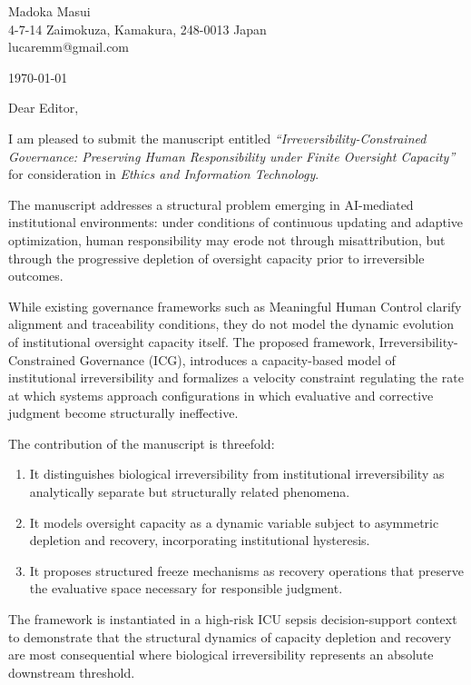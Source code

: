 \documentclass[12pt]{article}
\begin{document}
\noindent
Madoka Masui\\
4-7-14 Zaimokuza, Kamakura, 248-0013 Japan\\
lucaremm@gmail.com

\bigskip
\noindent
\today

\bigskip
\noindent
Dear Editor,

\bigskip
I am pleased to submit the manuscript entitled \textit{``Irreversibility-Constrained
Governance: Preserving Human Responsibility under Finite Oversight Capacity''} for
consideration in \textit{Ethics and Information Technology}.

The manuscript addresses a structural problem emerging in AI-mediated institutional
environments: under conditions of continuous updating and adaptive optimization, human
responsibility may erode not through misattribution, but through the progressive depletion
of oversight capacity prior to irreversible outcomes.

While existing governance frameworks such as Meaningful Human Control clarify alignment
and traceability conditions, they do not model the dynamic evolution of institutional
oversight capacity itself. The proposed framework, Irreversibility-Constrained Governance
(ICG), introduces a capacity-based model of institutional irreversibility and formalizes
a velocity constraint regulating the rate at which systems approach configurations in which
evaluative and corrective judgment become structurally ineffective.

The contribution of the manuscript is threefold:

\begin{enumerate}
  \item It distinguishes biological irreversibility from institutional irreversibility as
        analytically separate but structurally related phenomena.
  \item It models oversight capacity as a dynamic variable subject to asymmetric depletion
        and recovery, incorporating institutional hysteresis.
  \item It proposes structured freeze mechanisms as recovery operations that preserve the
        evaluative space necessary for responsible judgment.
\end{enumerate}

The framework is instantiated in a high-risk ICU sepsis decision-support context to
demonstrate that the structural dynamics of capacity depletion and recovery are most
consequential where biological irreversibility represents an absolute downstream threshold.
\end{document}

